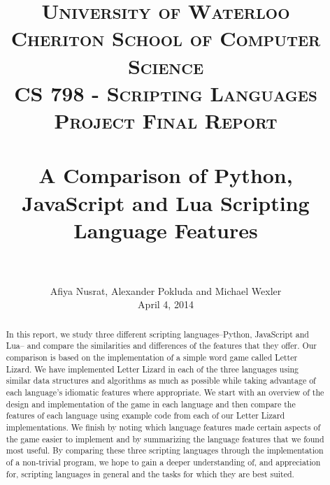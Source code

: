 \documentclass[letterpaper, 12pt, titlepage, final]{article}
\title{
		\usefont{OT1}{bch}{b}{n}
		\normalfont \normalsize \textsc{University of Waterloo\\Cheriton School of Computer Science\\CS 798 - Scripting Languages Project Final Report} \\ [25pt]
		\horrule{0.5pt} \\[0.4cm]
		\huge A Comparison of Python, JavaScript and Lua Scripting Language Features \\
		\horrule{2pt} \\[0.5cm]
}
\author{
		\normalfont \normalsize
        Afiya Nusrat, Alexander Pokluda and Michael Wexler\\[-3pt] \normalsize
        April 4, 2014
}
\date{}
\begin{document}
\maketitle

\thispagestyle{fancy}

\begin{abstract}

In this report, we study three different scripting languages--Python, JavaScript and Lua--
and compare the similarities and differences of the features that they offer.
Our comparison is based on the implementation of a simple word game called Letter Lizard.
We have implemented Letter Lizard in each of the three languages using similar
data structures and algorithms as much as possible while taking advantage of each
language's idiomatic features where appropriate. We start with an overview of the
design and implementation of the game in each language and then compare the
features of each language using example code from each of our Letter Lizard implementations.
We finish by noting which language features made certain aspects of the game
easier to implement and by summarizing the language features that we found most
useful. By comparing these three scripting languages through the implementation
of a non-trivial program, we hope to gain a deeper understanding of, and appreciation
for, scripting languages in general and the tasks for which they are best suited.

\end{abstract}

\cleardoublepage

\renewcommand\contentsname{Table of Contents}
\tableofcontents
\cleardoublepage
{}

\listoffigures
\cleardoublepage
{}		%

\lstlistoflistings
\cleardoublepage
{}		%


\cleardoublepage

\setcounter{page}{1}
\end{document}
